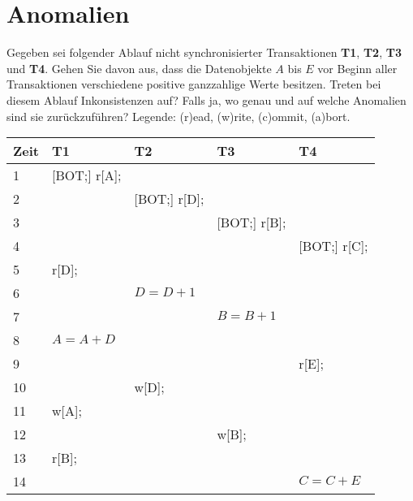\section{Anomalien}

Gegeben sei folgender Ablauf nicht synchronisierter Transaktionen \textbf{T1}, \textbf{T2}, \textbf{T3} und \textbf{T4}. Gehen Sie davon aus, dass die Datenobjekte $A$ bis $E$ vor Beginn aller Transaktionen verschiedene positive ganzzahlige Werte besitzen. Treten bei diesem Ablauf Inkonsistenzen auf? Falls ja, wo genau und auf welche Anomalien sind sie zurückzuführen? Legende: (r)ead, (w)rite, (c)ommit, (a)bort.

\begin{tabular}{ | p{1cm} | p{2.8cm} | p{2.8cm} | p{2.8cm} | p{2.8cm} | }
	\hline
	\textbf{Zeit} & \textbf{T1}  & \textbf{T2}  & \textbf{T3}  & \textbf{T4}  \\ \hline
	1             & [BOT;] r[A]; &              &              &              \\ \hline
	2             &              & [BOT;] r[D]; &              &              \\ \hline
	3             &              &              & [BOT;] r[B]; &              \\ \hline
	4             &              &              &              & [BOT;] r[C]; \\ \hline
	5             & r[D];        &              &              &              \\ \hline
	6             &              & $D = D + 1$  &              &              \\ \hline
	7             &              &              & $B = B + 1$  &              \\ \hline
	8             & $A = A + D$  &              &              &              \\ \hline
	9             &              &              &              & r[E];        \\ \hline
	10            &              & w[D];        &              &              \\ \hline
	11            & w[A];        &              &              &              \\ \hline
	12            &              &              & w[B];        &              \\ \hline
	13            & r[B];        &              &              &              \\ \hline
	14            &              &              &              & $C = C +E$   \\ \hline

\end{tabular}
